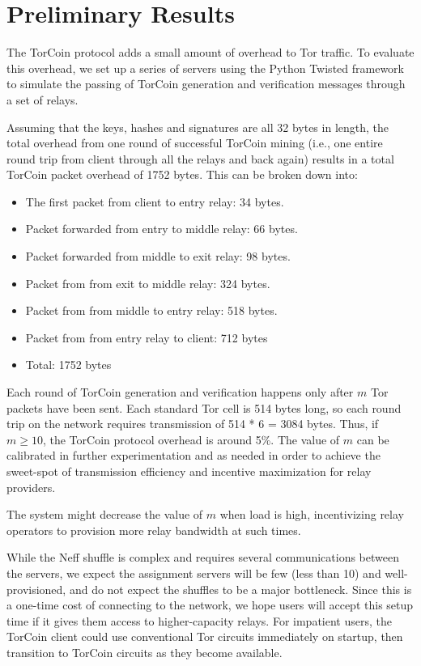 \section{Preliminary Results}

The TorCoin protocol adds a small amount of overhead to Tor traffic. 
To evaluate this overhead,
we set up a series of servers using the Python Twisted
framework\cite{twisted} to simulate the passing of TorCoin generation and
verification messages through a set of relays.

Assuming that the keys, hashes and signatures are all 32 bytes in length,
the total overhead from one round of successful TorCoin mining (i.e., one entire
round trip from client through all the relays and back again) results in a total
TorCoin packet overhead of 1752 bytes. This can be broken down into:

\begin{itemize}
	\item The first packet from client to entry relay: 34 bytes.
  \item Packet forwarded from entry to middle relay: 66 bytes.
  \item Packet forwarded from middle to exit relay: 98 bytes.
  \item Packet from from exit to middle relay: 324 bytes.
  \item Packet from from middle to entry relay: 518 bytes.
  \item Packet from from entry relay to client: 712 bytes
  \item Total: 1752 bytes
\end{itemize}



Each round of TorCoin generation and verification happens only after $m$ Tor
packets have been sent. Each standard Tor cell is 514 bytes long, so each
round trip on the network requires transmission of 514 * 6 = 3084 bytes. Thus,
if $m \geq 10$, the TorCoin protocol overhead is around 5\%. The value of $m$
can be calibrated in further experimentation and as needed in order to achieve
the sweet-spot of transmission efficiency and incentive maximization for relay
providers.

The system might decrease the value of $m$ when load is high,
incentivizing relay operators
to provision more relay bandwidth at such times.

While the Neff shuffle is complex and requires several
communications between the servers,
we expect the assignment servers will be few (less than 10)
and well-provisioned,
and do not expect the shuffles to be a major bottleneck.
Since this is a one-time cost of connecting to the network,
we hope users will accept this setup time
if it gives them access to higher-capacity relays.
For impatient users,
the TorCoin client could use conventional Tor circuits immediately on startup,
then transition to TorCoin circuits as they become available.

